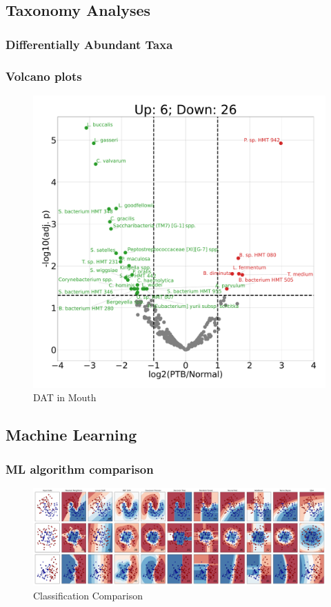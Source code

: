 \documentclass{beamer}
\begin{document}
    \subsection{Taxonomy Analyses}
    \subsubsection{Differentially Abundant Taxa}
    \begin{frame}
        \frametitle{Volcano plots}

        \begin{figure}
            \includegraphics[width=0.5 \linewidth]{figures/Step44/singleton.DADA2.homd.uncorrected.Mouth.pdf}
            \caption{DAT in Mouth}
        \end{figure}
    \end{frame}

    \subsection{Machine Learning}
    \begin{frame}
        \frametitle{ML algorithm comparison}

        \begin{figure}
            \includegraphics[width=\linewidth]{figures/ML.png}
            \caption{Classification Comparison \protect\cite{sklearn1}}
        \end{figure}
    \end{frame}
\end{document}
